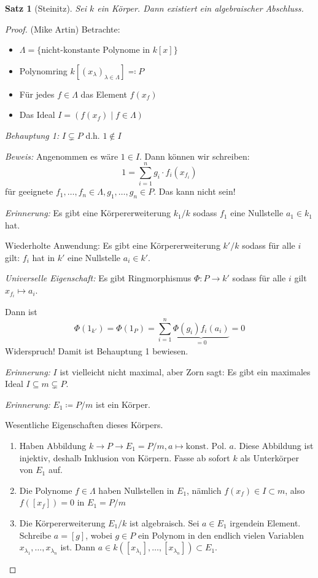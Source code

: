 \documentclass[a4paper,12pt,numbers=noenddot,parskip=full]{scrartcl}
\theoremstyle{dotless}
\newtheorem{theorem}{Satz}[section]
\theoremstyle{remark}
\begin{document}
	\begin{theorem}[Steinitz]
		Sei $k$ ein Körper. Dann existiert ein algebraischer Abschluss.
	\end{theorem}

	\begin{proof}(Mike Artin)
		Betrachte:
		\begin{itemize}
			\item $\Lambda = \{ \text{nicht-konstante Polynome in $k[x]$} \}$
			\item Polynomring $k[(x_\lambda)_{\lambda \in \Lambda}] \eqqcolon P$
			\item Für jedes $f \in \Lambda$ das Element $f(x_f)$
			\item Das Ideal $I = (f(x_f) \mid f \in \Lambda)$
		\end{itemize}
		\textit{Behauptung 1:} $I \subsetneq P$ d.h. $1 \notin I$
		
		\textit{Beweis:} Angenommen es wäre $1 \in I$. Dann können wir schreiben:
		\begin{equation*}
			1 = \sum_{i=1}^n g_i \cdot f_i(x_{f_i})
		\end{equation*}
		für geeignete $f_1, \dots, f_n \in \Lambda, g_1, \dots, g_n \in P$. Das kann nicht sein!
		
		\textit{Erinnerung:} Es gibt eine Körpererweiterung $k_1 / k$ sodass $f_1$ eine Nullstelle $a_1 \in k_1$ hat.
		
		Wiederholte Anwendung: Es gibt eine Körpererweiterung $k' /  k$ sodass für alle $i$ gilt: $f_i$ hat in $k'$ eine Nullstelle $a_i \in k'$.
		
		\textit{Universelle Eigenschaft:} Es gibt Ringmorphismus $\Phi: P \to k'$ sodass für alle $i$ gilt $x_{f_i} \mapsto a_i$.
		
		Dann ist
		\begin{equation*}
			\Phi(1_{k'}) = \Phi(1_P) = \sum_{i = 1}^n \underbrace{\Phi(g_i) f_i(a_i)}_{=0} = 0
		\end{equation*}
		Widerspruch! Damit ist Behauptung 1 bewiesen.
		
		\textit{Erinnerung:} $I$ ist vielleicht nicht maximal, aber Zorn sagt: Es gibt ein maximales Ideal $I \subseteq m \subsetneq P$.
		
		\textit{Erinnerung:} $E_1 \coloneqq P/m$ ist ein Körper.
		
		Wesentliche Eigenschaften dieses Körpers.
		\begin{enumerate}
			\item Haben Abbildung $k \to P \to E_1 = P/m, a \mapsto \text{konst. Pol. $a$}$. Diese Abbildung ist injektiv, deshalb Inklusion von Körpern. Fasse ab sofort $k$ als Unterkörper von $E_1$ auf.
			\item Die Polynome $f \in \Lambda$ haben Nullstellen in $E_1$, nämlich $f(x_f) \in I \subset m$, also $f([x_f]) = 0$ in $E_1 = P / m$
			\item Die Körpererweiterung $E_1 / k$ ist algebraisch. Sei $a \in E_1$ irgendein Element. Schreibe $a = [g]$, wobei $g \in P$ ein Polynom in den endlich vielen Variablen $x_{\lambda_1}, \dots, x_{\lambda_n}$ ist.
			Dann $a \in k([x_{\lambda_1}], \dots, [x_{\lambda_n}]) \subset E_1$.
			

\end{enumerate}
\end{proof}
\end{document}

